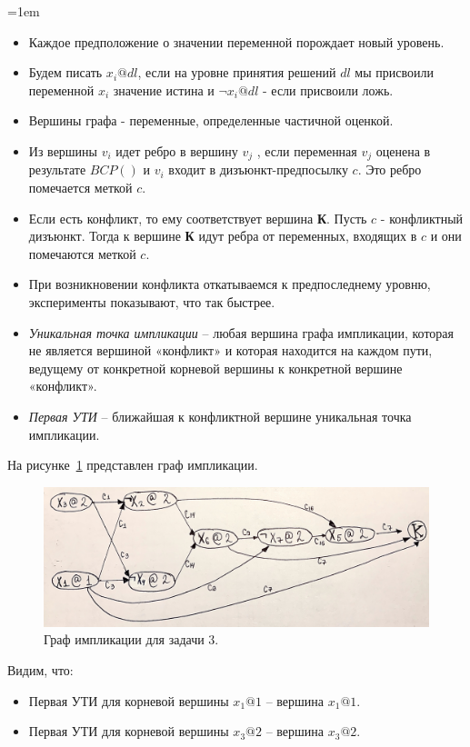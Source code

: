 \documentclass[12pt]{extreport}
\theoremstyle{definiton}
\theoremstyle{definition}
\theoremstyle{definition}
\newenvironment{blockquote}{%
  \par%
  \medskip
  \leftskip=1em%
  \noindent}{%
  \par\medskip}
\begin{document}
\begin{blockquote}
{\begin{itemize}
    \item Каждое предположение о значении переменной порождает новый уровень.
    \item Будем писать $x_i @ dl$, если на уровне принятия решений $dl$ мы присвоили переменной $x_i$ значение истина и $\neg{x_i}  @ dl$ - если присвоили ложь.
    \item Вершины графа - переменные, определенные частичной оценкой.
    \item Из вершины $v_i$ идет ребро в вершину $v_j$ , если переменная $v_j$ оценена в результате $BCP()$ и $v_i$ входит в дизъюнкт-предпосылку $c$. Это ребро помечается меткой $c$.
    \item Если есть конфликт, то ему соответствует вершина \textbf{К}. Пусть $c$ - конфликтный дизъюнкт. Тогда к вершине \textbf{К} идут ребра от переменных, входящих в $c$ и они помечаются меткой $c$.
    \item При возникновении конфликта откатываемся к предпоследнему уровню, эксперименты показывают, что так быстрее.
    \item \textit{Уникальная точка импликации} -- любая вершина графа импликации, которая не является вершиной «конфликт» и которая находится на каждом пути, ведущему от конкретной корневой вершины к конкретной вершине «конфликт».
    \item \textit{Первая УТИ} -- ближайшая к конфликтной вершине уникальная точка импликации.
\end{itemize}
На рисунке~\ref{ris:cdcl} представлен граф импликации.
\begin{figure}[H]
    \centering
    \includegraphics[width=16.5cm]{images/cdcl.JPG}
    \caption{Граф импликации для задачи $3$.}
    \label{ris:cdcl}
\end{figure}

Видим, что:
\begin{itemize}
    \item Первая УТИ для корневой вершины \textbf{$x_1 @ 1$} -- вершина \textbf{$x_1 @ 1$}.
    \item Первая УТИ для корневой вершины \textbf{$x_3 @ 2$} -- вершина \textbf{$x_3 @ 2$}.
\end{itemize}



}
\end{blockquote}
\end{document}
